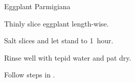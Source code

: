 \begin{recipe}{Eggplant Parmigiana}{}{}

\begin{ingredients}
\item {}
\end{ingredients}

\begin{directions}
\item Thinly slice eggplant length-wise.
\item Salt slices and let stand \half{} to 1~hour.
\item Rinse well with tepid water and pat dry.
\item Follow steps in .
\end{directions}
\end{recipe}
